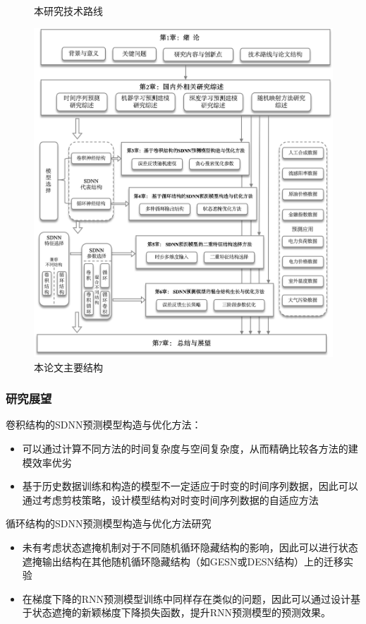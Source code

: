 \begin{frame}
\begin{figure}[!t]
\begin{minipage}{0.45\textwidth}
            \caption*{本研究技术路线}
        \end{minipage}
        \hfill
        \begin{minipage}{0.45\textwidth}
            \centering
            \includegraphics[width=0.9\linewidth]{float/ch.intro/thesis_content.png}
            \caption*{本论文主要结构}
        \end{minipage}

    \end{figure}
\end{frame}

\begin{frame}
    \frametitle{研究展望}
         
    卷积结构的SDNN预测模型构造与优化方法：
    \begin{itemize}
        \item 可以通过计算不同方法的时间复杂度与空间复杂度，从而精确比较各方法的建模效率优劣
        \item 基于历史数据训练和构造的模型不一定适应于时变的时间序列数据，因此可以通过考虑剪枝策略，设计模型结构对时变时间序列数据的自适应方法
    \end{itemize}

    循环结构的SDNN预测模型构造与优化方法研究
    \begin{itemize}
        \item 未有考虑状态遮掩机制对于不同随机循环隐藏结构的影响，因此可以进行状态遮掩输出结构在其他随机循环隐藏结构（如GESN或DESN结构）上的迁移实验
        \item 在梯度下降的RNN预测模型训练中同样存在类似的问题，因此可以通过设计基于状态遮掩的新颖梯度下降损失函数，提升RNN预测模型的预测效果。
    \end{itemize}

\end{frame}

